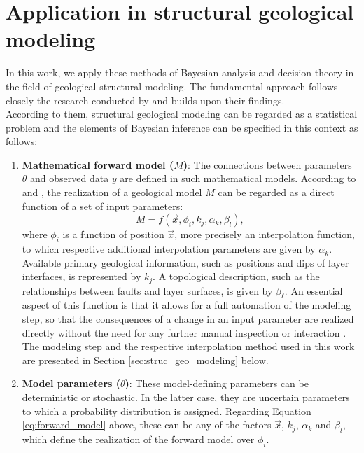         \section{Application in structural geological modeling}\label{sec:bayes_in_struc_modeling}
        In this work, we apply these methods of Bayesian analysis and decision theory in the field of geological structural modeling. The fundamental approach follows closely the research conducted by \citet{delaVarga2016} and builds upon their findings.\\
        According to them, structural geological modeling can be regarded as a statistical problem and the elements of Bayesian inference can be specified in this context as follows:
        \begin{enumerate}
        	\item \textbf{Mathematical forward model ($M$)}: The connections between parameters $\theta$ and observed data $y$ are defined in such mathematical models. According to \citet{wellmann2010towards} and \citet{delaVarga2016}, the realization of a geological model $M$ can be regarded as a direct function of a set of input parameters:
        	\begin{equation}
        	M = f(\vec{x}, \phi_i, k_j, \alpha_k, \beta_l)\label{eq:forward_model},
        	\end{equation}
        	where $\phi_i$ is a function of position $\vec{x}$, more precisely an interpolation function, to which respective additional interpolation parameters are given by $\alpha_k$. Available primary geological information, such as positions and dips of layer interfaces, is represented by $k_j$. A topological description, such as the relationships between faults and layer surfaces, is given by $\beta_\ell$. An essential aspect of this function is that it allows for a full automation of the modeling step, so that the consequences of a change in an input parameter are realized directly without the need for any further manual inspection or interaction \citep{wellmann2017sandstone, delaVarga2016}. The modeling step and the respective interpolation method used in this work are presented in Section \ref{sec:struc_geo_modeling} below.
        	\item \textbf{Model parameters ($\theta$)}: These model-defining parameters can be deterministic or stochastic. In the latter case, they are uncertain parameters to which a probability distribution is assigned. Regarding Equation \ref{eq:forward_model} above, these can be any of the factors $\vec{x}$, $k_j$, $\alpha_k$ and $\beta_l$, which define the realization of the forward model over $\phi_i$.

\end{enumerate}
